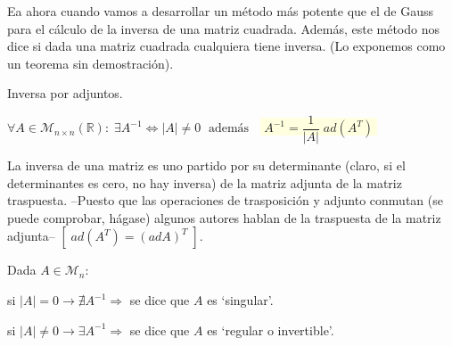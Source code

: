 Ea ahora cuando vamos a desarrollar un método más potente que el de Gauss para el cálculo de la inversa de una matriz cuadrada. Además, este método nos dice si dada una matriz cuadrada cualquiera tiene inversa. (Lo exponemos como un teorema sin demostración).

\begin{teor}{Inversa por adjuntos.}

$\forall A\in \mathcal M_{n \times n}(\mathbb R): \; \exists A^{-1} \Leftrightarrow |A|\neq 0 \; \text{ además }	\;$ \colorbox{LightYellow}{$\boxed{\; A^{-1}=\dfrac 1 {|A|}\; ad(A^T)\; }$}

La inversa de una matriz es uno partido por su determinante \textcolor{gris}{(claro, si el determinantes es cero, no hay inversa)} de la matriz adjunta de la matriz traspuesta. --Puesto que las operaciones de trasposición y adjunto conmutan (se puede comprobar, hágase) algunos autores hablan de la traspuesta de la matriz adjunta-- $[\;ad(A^T)=(ad A)^T \;]$.
\end{teor}

\begin{defi}
Dada $A\in \mathcal M_{n}:$

si $|A|=0 \to \nexists A^{-1} \Rightarrow $ se dice que $A$ es `singular'.

si $|A|\neq 0 \to \exists A^{-1} \Rightarrow $ se dice que $A$ es `regular o invertible'.
\end{defi}


